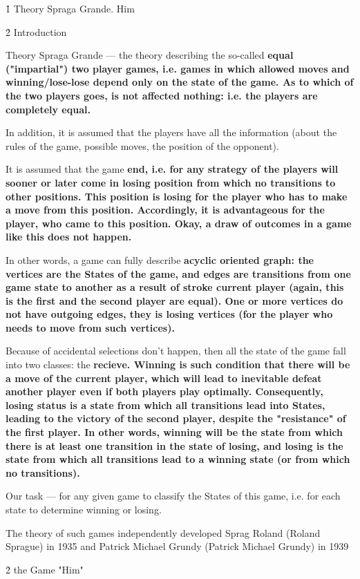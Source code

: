 \h1{ Theory Spraga Grande. Him }


\h2{ Introduction }

Theory Spraga Grande --- the theory describing the so-called \bf{equal} ("impartial") two player games, i.e. games in which allowed moves and winning/lose-lose depend only on the state of the game. As to which of the two players goes, is not affected nothing: i.e. the players are completely equal.

In addition, it is assumed that the players have all the information (about the rules of the game, possible moves, the position of the opponent).

It is assumed that the game \bf{end}, i.e. for any strategy of the players will sooner or later come in \bf{losing} position from which no transitions to other positions. This position is losing for the player who has to make a move from this position. Accordingly, it is advantageous for the player, who came to this position. Okay, a draw of outcomes in a game like this does not happen.

In other words, a game can fully describe \bf{acyclic oriented graph}: the vertices are the States of the game, and edges are transitions from one game state to another as a result of stroke current player (again, this is the first and the second player are equal). One or more vertices do not have outgoing edges, they is losing vertices (for the player who needs to move from such vertices).

Because of accidental selections don't happen, then all the state of the game fall into two classes: the \bf{recieve}. Winning is such condition that there will be a move of the current player, which will lead to inevitable defeat another player even if both players play optimally. Consequently, losing status is a state from which all transitions lead into States, leading to the victory of the second player, despite the "resistance" of the first player. In other words, winning will be the state from which there is at least one transition in the state of losing, and losing is the state from which all transitions lead to a winning state (or from which no transitions).

Our task --- for any given game to classify the States of this game, i.e. for each state to determine winning or losing.

The theory of such games independently developed Sprag Roland (Roland Sprague) in 1935 and Patrick Michael Grundy (Patrick Michael Grundy) in 1939


\h2{ the Game "Him" }

